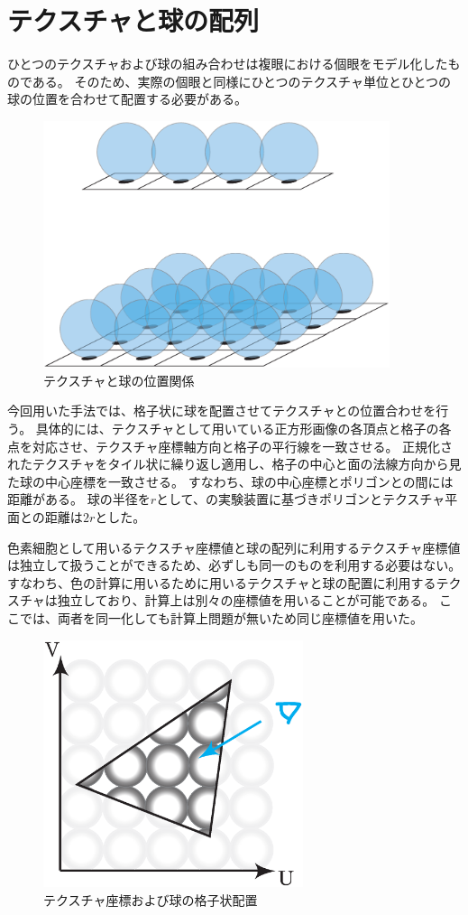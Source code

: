\section{テクスチャと球の配列}
\label{STextureandsphere}

ひとつのテクスチャおよび球の組み合わせは複眼における個眼をモデル化したものである。
そのため、実際の個眼と同様にひとつのテクスチャ単位とひとつの球の位置を合わせて配置する必要がある。
\begin{figure}[h]
  \centering
  \includegraphics[width=4.0in]{./img/tex_sphere_pos.eps}
  \caption{テクスチャと球の位置関係}
  \label{FTexturesphereposition}
\end{figure}
今回用いた手法では、格子状に球を配置させてテクスチャとの位置合わせを行う。
具体的には、テクスチャとして用いている正方形画像の各頂点と格子の各点を対応させ、テクスチャ座標軸方向と格子の平行線を一致させる。
正規化されたテクスチャをタイル状に繰り返し適用し、格子の中心と面の法線方向から見た球の中心座標を一致させる。
すなわち、球の中心座標とポリゴンとの間には距離がある。
球の半径を$r$として、の実験装置に基づきポリゴンとテクスチャ平面との距離は$2r$とした。

色素細胞として用いるテクスチャ座標値と球の配列に利用するテクスチャ座標値は独立して扱うことができるため、必ずしも同一のものを利用する必要はない。
すなわち、色の計算に用いるために用いるテクスチャと球の配置に利用するテクスチャは独立しており、計算上は別々の座標値を用いることが可能である。
ここでは、両者を同一化しても計算上問題が無いため同じ座標値を用いた。

\begin{figure}[h]
  \centering
  \includegraphics[width=3.0in]{./img/sphere_position.eps}
  \caption{テクスチャ座標および球の格子状配置}
  \label{FGrid}
\end{figure}

